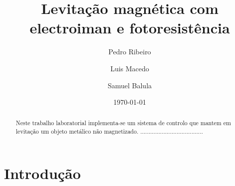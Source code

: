 \documentclass[%
  reprint,
  nofootinbib,
  amsmath,amssymb,
  aps,
  10pt,
  a4paper
]{revtex4-1}
\begin{document}


 

\title{Levitação magnética com electroiman e fotoresistência}

\author{Pedro Ribeiro}%
\author{Luis Macedo}%
\author{Samuel Balula}%



\date{\today}

\begin{abstract}
Neste trabalho laboratorial implementa-se um sistema de controlo que mantem em levitação um objeto metálico não magnetizado.
......................................


\end{abstract}
\maketitle


\section{Introdução}
\label{s:intro}
\end{document}
